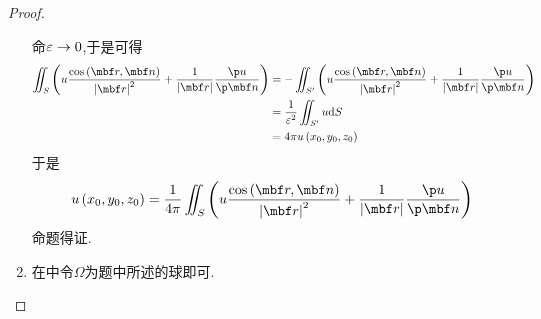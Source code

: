 \documentclass{ctexart}
\begin{document}
\begin{proof}
\begin{enumerate}[label=\tbf{(\arabic*)}]
            命$\varepsilon\to0$,于是可得
            \[\begin{aligned}
                \iint_S\left(u\dfrac{\cos\left(\mbf r,\mbf n\right)}{\left|\mbf r\right|^2}+\dfrac{1}{\left|\mbf r\right|}\dfrac{\p u}{\p\mbf n}\right)
                &= -\iint_{S'}\left(u\dfrac{\cos\left(\mbf r,\mbf n\right)}{\left|\mbf r\right|^2}+\dfrac{1}{\left|\mbf r\right|}\dfrac{\p u}{\p\mbf n}\right) \\
                &= \dfrac{1}{\ep^2}\iint_{S'}u\di S \\
                &= 4\pi u\left(x_0,y_0,z_0\right)
            \end{aligned}\]
            于是
            \[u\left(x_0,y_0,z_0\right)=\dfrac{1}{4\pi}\iint_S\left(u\dfrac{\cos\left(\mbf r,\mbf n\right)}{\left|\mbf r\right|^2}+\dfrac{1}{\left|\mbf r\right|}\dfrac{\p u}{\p\mbf n}\right)\]
            命题得证.
        \item 在中令$\Omega$为题中所述的球即可.
    \end{enumerate}
\end{proof}
\end{document}
